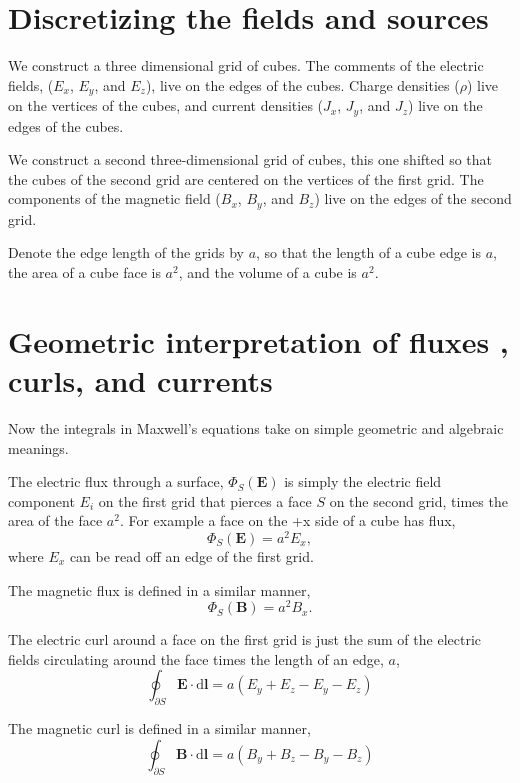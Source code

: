\documentclass[11pt]{amsart}
\begin{document}
\section{Discretizing the fields and sources}
We construct a three dimensional grid of cubes. The comments of
the electric fields, ($E_x$, $E_y$, and $E_z$),
live on the edges of the cubes.
Charge densities ($\rho$) live on the vertices of the cubes, and current densities
($J_x$, $J_y$, and $J_z$)
live on the edges of the cubes.

We construct a second three-dimensional grid of cubes, this one shifted
so that the cubes of the second grid are centered on the vertices of the
first grid.
The components of the magnetic field ($B_x$, $B_y$, and $B_z$) live
 on the edges of the second grid.
 
 Denote the edge length of the grids by $a$, so that the length of a cube edge
 is $a$, the area of a cube face is $a^2$, and the volume of a cube is $a^2$.
 
 \section{Geometric interpretation of fluxes , curls, and currents}
 
 Now the integrals in Maxwell's equations take on simple geometric and
 algebraic meanings.
 
 The electric flux through a surface, $\Phi_S(\mathbf{E})$ is simply
 the electric field component $E_i$ on the first grid that pierces a face $S$ on the
 second grid, times the area of the face $a^2$.
 For example a face on the +x side of a cube has flux,
 \begin{equation}
 \Phi_S(\mathbf{E}) = a^2 E_x,
 \end{equation}
 where $E_x$ can be read off an edge of the first grid.
 
 The magnetic flux is defined in a similar manner,
 \begin{equation}
 \Phi_S(\mathbf{B}) = a^2 B_x.
 \end{equation}
 
 The electric curl around a face on the first grid
 is just the sum of the electric fields circulating around the face
 times the length of an edge, $a$,
 \begin{equation}
 \oint_{\partial S} \mathbf{E}\cdot \mathrm{d}\mathbf{l}
 = a (E_y + E_z -E_y -E_z)
 \end{equation}
 
 The magnetic curl is defined in a similar manner,
 \begin{equation}
 \oint_{\partial S} \mathbf{B}\cdot \mathrm{d}\mathbf{l}
 = a (B_y + B_z -B_y -B_z)
 \end{equation}
\end{document}
